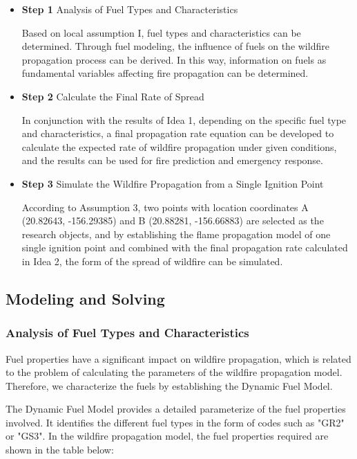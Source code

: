 \documentclass[12pt]{article}  %
\begin{document}
\begin{itemize}
	\setlength{\parsep}{0ex} 
	\setlength{\topsep}{2ex} 
	\setlength{\itemsep}{1ex} 
	\item \textbf{Step 1}  Analysis of Fuel Types and Characteristics
	
	Based on local assumption I, fuel types and characteristics can be determined. Through fuel modeling, the influence of fuels on the wildfire propagation process can be derived. In this way, information on fuels as fundamental variables affecting fire propagation can be determined.
	
	\item \textbf{Step 2}  Calculate the Final Rate of Spread
	
	In conjunction with the results of Idea 1, depending on the specific fuel type and characteristics, a final propagation rate equation can be developed to calculate the expected rate of wildfire propagation under given conditions, and the results can be used for fire prediction and emergency response.
	
	\item \textbf{Step 3}  Simulate the Wildfire Propagation from a Single Ignition Point
	
	According to Assumption 3, two points with location coordinates A (20.82643, -156.29385) and B (20.88281, -156.66883) are selected as the research objects, and by establishing the flame propagation model of one single ignition point and combined with the final propagation rate calculated in Idea 2, the form of the spread of wildfire can be simulated. 
\end{itemize}

\subsection{Modeling and Solving}
\subsubsection{Analysis of Fuel Types and Characteristics}
Fuel properties have a significant impact on wildfire propagation, which is related to the problem of calculating the parameters of the wildfire propagation model. Therefore, we characterize the fuels by establishing the Dynamic Fuel Model.

The Dynamic Fuel Model provides a detailed parameterize of the fuel properties involved. It identifies the different fuel types in the form of codes such as "GR2" or "GS3". In the wildfire propagation model, the fuel properties required are shown in the table below:
\end{document}
